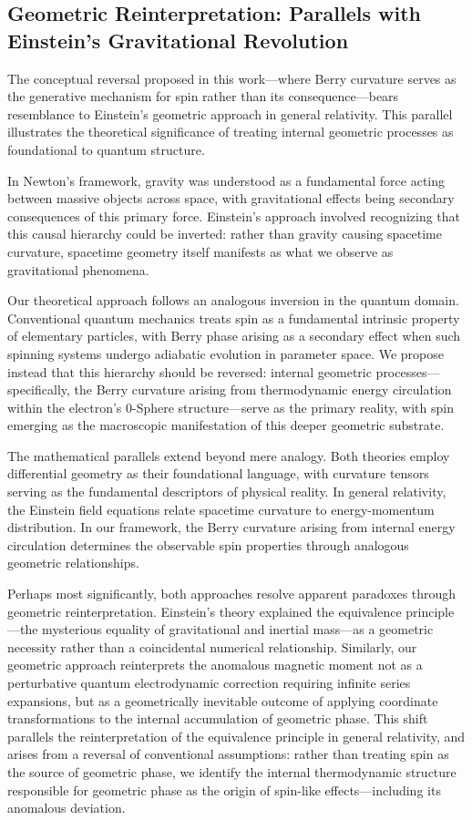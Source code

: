 \documentclass[%
 reprint,
 amsmath,amssymb,
 aps,
]{revtex4-1}
\numberwithin{equation}{section}%
\begin{document}
\subsection{Geometric Reinterpretation: Parallels with Einstein's Gravitational Revolution} \label{subsec:geometric_reinterpretation}

The conceptual reversal proposed in this work—where Berry curvature serves as the generative mechanism for spin rather than its consequence—bears resemblance to Einstein's geometric approach in general relativity. This parallel illustrates the theoretical significance of treating internal geometric processes as foundational to quantum structure.

In Newton's framework, gravity was understood as a fundamental force acting between massive objects across space, with gravitational effects being secondary consequences of this primary force. Einstein's approach involved recognizing that this causal hierarchy could be inverted: rather than gravity causing spacetime curvature, spacetime geometry itself manifests as what we observe as gravitational phenomena.

Our theoretical approach follows an analogous inversion in the quantum domain. Conventional quantum mechanics treats spin as a fundamental intrinsic property of elementary particles, with Berry phase arising as a secondary effect when such spinning systems undergo adiabatic evolution in parameter space. We propose instead that this hierarchy should be reversed: internal geometric processes—specifically, the Berry curvature arising from thermodynamic energy circulation within the electron's 0-Sphere structure—serve as the primary reality, with spin emerging as the macroscopic manifestation of this deeper geometric substrate.

The mathematical parallels extend beyond mere analogy. Both theories employ differential geometry as their foundational language, with curvature tensors serving as the fundamental descriptors of physical reality. In general relativity, the Einstein field equations relate spacetime curvature to energy-momentum distribution. In our framework, the Berry curvature arising from internal energy circulation determines the observable spin properties through analogous geometric relationships.

Perhaps most significantly, both approaches resolve apparent paradoxes through geometric reinterpretation. Einstein's theory explained the equivalence principle—the mysterious equality of gravitational and inertial mass—as a geometric necessity rather than a coincidental numerical relationship. Similarly, our geometric approach reinterprets the anomalous magnetic moment not as a perturbative quantum electrodynamic correction requiring infinite series expansions, but as a geometrically inevitable outcome of applying coordinate transformations to the internal accumulation of geometric phase. This shift parallels the reinterpretation of the equivalence principle in general relativity, and arises from a reversal of conventional assumptions: rather than treating spin as the source of geometric phase, we identify the internal thermodynamic structure responsible for geometric phase as the origin of spin-like effects—including its anomalous deviation.
\end{document}
